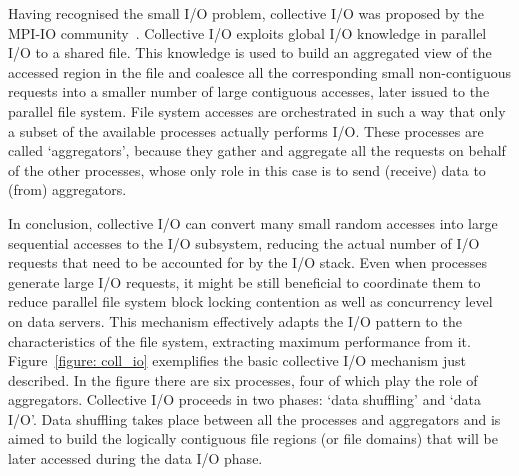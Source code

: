 Having recognised the small I/O problem, collective I/O was proposed by the MPI-IO community~\cite{ThakurGL99}. Collective I/O exploits global I/O knowledge in parallel I/O to a shared file. This knowledge is used to build an aggregated view of the accessed region in the file and coalesce all the corresponding small non-contiguous requests into a smaller number of large contiguous accesses, later issued to the parallel file system. File system accesses are orchestrated in such a way that only a subset of the available processes actually performs I/O. These processes are called `aggregators', because they gather and aggregate all the requests on behalf of the other processes, whose only role in this case is to send (receive) data to (from) aggregators.

In conclusion, collective I/O can convert many small random accesses into large sequential accesses to the I/O subsystem, reducing the actual number of I/O requests that need to be accounted for by the I/O stack. Even when processes generate large I/O requests, it might be still beneficial to coordinate them to reduce parallel file system block locking contention as well as concurrency level on data servers. This mechanism effectively adapts the I/O pattern to the characteristics of the file system, extracting maximum performance from it.
Figure~\ref{figure: coll_io} exemplifies the basic collective I/O mechanism just described. In the figure there are six processes, four of which play the role of aggregators. Collective I/O proceeds in two phases: `data shuffling' and `data I/O'. Data shuffling takes place between all the processes and aggregators and is aimed to build the logically contiguous file regions (or file domains) that will be later accessed during the data I/O phase.

